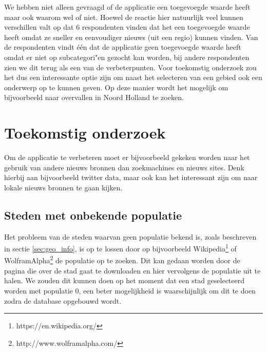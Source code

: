 \documentclass[twoside,openright]{uva-bachelor-thesis}
\begin{document}
	We hebben niet alleen gevraagd of de applicatie een toegevoegde waarde heeft maar ook waarom wel of niet. Hoewel de reactie hier natuurlijk veel kunnen verschillen valt op dat $6$ respondenten vinden dat het een toegevoegde waarde heeft omdat ze sneller en eenvoudiger nieuws (uit een regio) kunnen vinden. Van de respondenten vindt \'e\'en dat de applicatie geen toegevoegde waarde heeft omdat er niet op subcategori"en gezocht kan worden, bij andere respondenten zien we dit terug als een van de verbeterpunten. Voor toekomstig onderzoek zou het dus een interessante optie zijn om naast het selecteren van een gebied ook een onderwerp op te kunnen geven. Op deze manier wordt het mogelijk om bijvoorbeeld naar overvallen in Noord Holland te zoeken.
	
	\section{Toekomstig onderzoek}
		Om de applicatie te verbeteren moet er bijvoorbeeld gekeken worden naar het gebruik van andere nieuws bronnen dan zoekmachines en nieuws sites. Denk hierbij aan bijvoorbeeld twitter data, maar ook kan het interessant zijn om naar lokale nieuws bronnen te gaan kijken.
		\subsection{Steden met onbekende populatie}
			\label{sec:citiespop}
			Het probleem van de steden waarvan geen populatie bekend is, zoals beschreven in sectie \ref{sec:geo_info}, is op te lossen door op bijvoorbeeld Wikipedia\footnote{https://en.wikipedia.org/} of WolframAlpha\footnote{http://www.wolframalpha.com/} de populatie op te zoeken. Dit kan gedaan worden door de pagina die over de stad gaat te downloaden en hier vervolgens de populatie uit te halen. We zouden dit kunnen doen op het moment dat een stad geselecteerd worden met populatie $0$, een beter mogelijkheid is waarschijnlijk om dit te doen zodra de database opgebouwd wordt.
\end{document}
